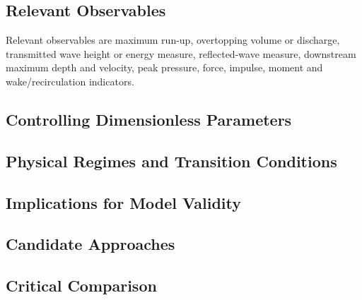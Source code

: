 
\subsection{Relevant Observables}
\label{sec:res-phy-bar-relevant-observables}


Relevant observables are maximum run-up, overtopping volume or
discharge, transmitted wave height or energy measure, reflected-wave
measure, downstream maximum depth and velocity, peak pressure, force,
impulse, moment and wake/recirculation indicators.

\subsection{Controlling Dimensionless Parameters}
\label{sec:res-phy-bar-controlling-dimensionless-parameters}


\subsection{Physical Regimes and Transition Conditions}
\label{sec:res-phy-bar-physical-regimes-transition-conditions}


\subsection{Implications for Model Validity}
\label{sec:res-phy-bar-model-validity-implications}


\subsection{Candidate Approaches}
\label{sec:res-phy-bar-candidate-approaches}


\subsection{Critical Comparison}
\label{sec:res-phy-bar-critical-comparison}

